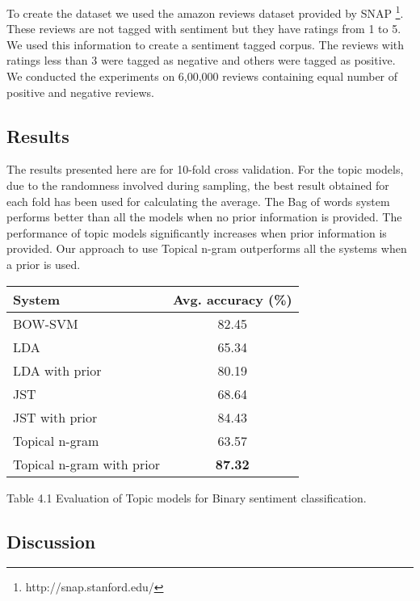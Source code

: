 To create the dataset we used the amazon reviews dataset provided by SNAP \footnote{http://snap.stanford.edu/}. These reviews are not tagged with sentiment but they have 
ratings from 1 to 5. We used this information to create a sentiment tagged corpus. The reviews with ratings less than 3 were tagged as negative and others were tagged
as positive. We conducted the experiments on 6,00,000 reviews containing equal number of positive and negative reviews.

\subsection{Results}\label{results}

The results presented here are for 10-fold cross validation. For the topic models, due to the randomness involved during sampling, the best result obtained for each fold 
has been used for calculating the average. The Bag of words system performs better than all the models when no prior information is provided. The performance of topic 
models significantly increases when prior information is provided. Our approach to use Topical n-gram outperforms all the systems when a prior is used.

\begin{center}
\begin{tabular}{|l|c|}
\hline \bf System & \bf Avg. accuracy (\%)\\ \hline
BOW-SVM & 82.45\\
LDA & 65.34\\
LDA with prior & 80.19\\
JST & 68.64\\
JST with prior & 84.43\\
Topical n-gram & 63.57\\
Topical n-gram with prior & \textbf{87.32}\\
\hline
\end{tabular}
\end{center}
\begin{center}
 Table 4.1 Evaluation of Topic models for Binary sentiment classification.
\end{center}

\subsection{Discussion}\label{discussion}


